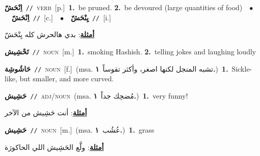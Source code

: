 \documentclass[10pt,a4paper,twoside]{article} %
\begin{document}
\begin{multicols}{2}
{\setlength\topsep{0pt}\textbf{\foreignlanguage{arabic}{اِنْحَشّ}}\ {\color{gray}\texttt{//}\color{black}}\ \textsc{verb}\ [p.]\ \textbf{1.}~be pruned.  \textbf{2.}~be devoured (large quantities of food)\ \ $\bullet$\ \ \setlength\topsep{0pt}\textbf{\foreignlanguage{arabic}{اِنْحَشّ}}\ {\color{gray}\texttt{//}\color{black}}\ [c.]\ \ $\bullet$\ \ \setlength\topsep{0pt}\textbf{\foreignlanguage{arabic}{يِنْحَشّ}}\ {\color{gray}\texttt{//}\color{black}}\ [i.]\  \begin{flushright}\color{gray}\foreignlanguage{arabic}{\textbf{\underline{\foreignlanguage{arabic}{أمثلة}}}: بدي هالحرش كله يِنْحَشّ}\end{flushright}\color{black}} \vspace{2mm}

{\setlength\topsep{0pt}\textbf{\foreignlanguage{arabic}{تَحْشِيش}}\ {\color{gray}\texttt{//}\color{black}}\ \textsc{noun}\ [m.]\ \textbf{1.}~smoking Hashish.  \textbf{2.}~telling jokes and laughing loudly\ } \vspace{2mm}

{\setlength\topsep{0pt}\textbf{\foreignlanguage{arabic}{حَاشُوشِة}}\ {\color{gray}\texttt{//}\color{black}}\ \textsc{noun}\ [f.]\ \color{gray}(msa. \foreignlanguage{arabic}{تشبه المنجل لكنها اصغر، وأكثر تقوساً}~\foreignlanguage{arabic}{\textbf{١.}})\color{black}\ \textbf{1.}~Sickle-like, but smaller, and more curved.\ } \vspace{2mm}

{\setlength\topsep{0pt}\textbf{\foreignlanguage{arabic}{حَشِيش}}\ {\color{gray}\texttt{//}\color{black}}\ \textsc{adj/noun}\ \color{gray}(msa. \foreignlanguage{arabic}{مُضحِك جداً}~\foreignlanguage{arabic}{\textbf{١.}})\color{black}\ \textbf{1.}~very funny!\  \begin{flushright}\color{gray}\foreignlanguage{arabic}{\textbf{\underline{\foreignlanguage{arabic}{أمثلة}}}: أنت حَشِيش  من الآخر}\end{flushright}\color{black}} \vspace{2mm}

{\setlength\topsep{0pt}\textbf{\foreignlanguage{arabic}{حَشِيش}}\ {\color{gray}\texttt{//}\color{black}}\ \textsc{noun}\ [m.]\ \color{gray}(msa. \foreignlanguage{arabic}{عُشُب}~\foreignlanguage{arabic}{\textbf{١.}})\color{black}\ \textbf{1.}~grass\  \begin{flushright}\color{gray}\foreignlanguage{arabic}{\textbf{\underline{\foreignlanguage{arabic}{أمثلة}}}: ولَّع الحَشِيش اللي الحاكورَة}\end{flushright}\color{black}} \vspace{2mm}


\end{multicols}
\end{document}
